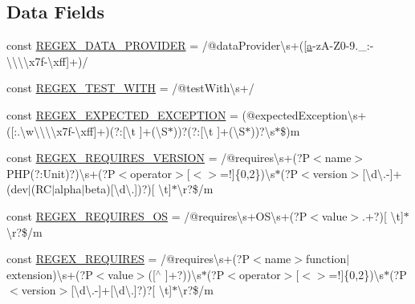 \subsection*{Data Fields}
\begin{DoxyCompactItemize}
\item 
const \mbox{\hyperlink{class_p_h_p_unit___util___test_a1b3ee24e7c7ec93bf0acc5adbe3aa9b0}{R\+E\+G\+E\+X\+\_\+\+D\+A\+T\+A\+\_\+\+P\+R\+O\+V\+I\+D\+ER}} = \textquotesingle{}/@data\+Provider\textbackslash{}s+(\mbox{[}\mbox{\hyperlink{interfacea}{a}}-\/zA-\/Z0-\/9.\+\_\+\+:-\/\textbackslash{}\textbackslash{}\textbackslash{}\textbackslash{}x7f-\/\textbackslash{}xff\mbox{]}+)/\textquotesingle{}
\item 
const \mbox{\hyperlink{class_p_h_p_unit___util___test_aab748c2f3fd97fa5863d387127882c57}{R\+E\+G\+E\+X\+\_\+\+T\+E\+S\+T\+\_\+\+W\+I\+TH}} = \textquotesingle{}/@test\+With\textbackslash{}s+/\textquotesingle{}
\item 
const \mbox{\hyperlink{class_p_h_p_unit___util___test_a2ce890f6751d460786f79997dec06743}{R\+E\+G\+E\+X\+\_\+\+E\+X\+P\+E\+C\+T\+E\+D\+\_\+\+E\+X\+C\+E\+P\+T\+I\+ON}} = \textquotesingle{}(@expected\+Exception\textbackslash{}s+(\mbox{[}\+:.\textbackslash{}w\textbackslash{}\textbackslash{}\textbackslash{}\textbackslash{}x7f-\/\textbackslash{}xff\mbox{]}+)(?\+:\mbox{[}\textbackslash{}t \mbox{]}+(\textbackslash{}S$\ast$))?(?\+:\mbox{[}\textbackslash{}t \mbox{]}+(\textbackslash{}S$\ast$))?\textbackslash{}s$\ast$\$)m\textquotesingle{}
\item 
const \mbox{\hyperlink{class_p_h_p_unit___util___test_a90cc8808192399dde41fee04b82bb7b5}{R\+E\+G\+E\+X\+\_\+\+R\+E\+Q\+U\+I\+R\+E\+S\+\_\+\+V\+E\+R\+S\+I\+ON}} = \textquotesingle{}/@requires\textbackslash{}s+(?P$<$name$>$P\+HP(?\+:Unit)?)\textbackslash{}s+(?P$<$operator$>$\mbox{[}$<$$>$=!\mbox{]}\{0,2\})\textbackslash{}s$\ast$(?P$<$version$>$\mbox{[}\textbackslash{}d\textbackslash{}.-\/\mbox{]}+(dev$\vert$(RC$\vert$alpha$\vert$beta)\mbox{[}\textbackslash{}d\textbackslash{}.\mbox{]})?)\mbox{[} \textbackslash{}t\mbox{]}$\ast$\textbackslash{}r?\$/m\textquotesingle{}
\item 
const \mbox{\hyperlink{class_p_h_p_unit___util___test_aab1a354980fb7ce403350ee18b56f5e1}{R\+E\+G\+E\+X\+\_\+\+R\+E\+Q\+U\+I\+R\+E\+S\+\_\+\+OS}} = \textquotesingle{}/@requires\textbackslash{}s+O\+S\textbackslash{}s+(?P$<$value$>$.+?)\mbox{[} \textbackslash{}t\mbox{]}$\ast$\textbackslash{}r?\$/m\textquotesingle{}
\item 
const \mbox{\hyperlink{class_p_h_p_unit___util___test_abef4dac60c1119b84deaf0369e1fab33}{R\+E\+G\+E\+X\+\_\+\+R\+E\+Q\+U\+I\+R\+ES}} = \textquotesingle{}/@requires\textbackslash{}s+(?P$<$name$>$function$\vert$extension)\textbackslash{}s+(?P$<$value$>$(\mbox{[}$^\wedge$ \mbox{]}+?))\textbackslash{}s$\ast$(?P$<$operator$>$\mbox{[}$<$$>$=!\mbox{]}\{0,2\})\textbackslash{}s$\ast$(?P$<$version$>$\mbox{[}\textbackslash{}d\textbackslash{}.-\/\mbox{]}+\mbox{[}\textbackslash{}d\textbackslash{}.\mbox{]}?)?\mbox{[} \textbackslash{}t\mbox{]}$\ast$\textbackslash{}r?\$/m\textquotesingle{}

\end{DoxyCompactItemize}
